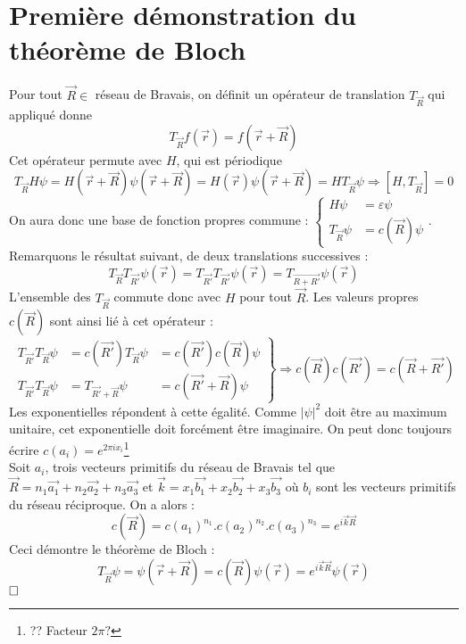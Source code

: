 	\section{Première démonstration du théorème de Bloch}
	Pour tout $\vec{R}\in$ réseau de Bravais, on définit un opérateur 
	de translation $T_{\vec{R}}$ qui appliqué donne
	\begin{equation}
	T_{\vec{R}}f(\vec{r}) = f(\vec{r}+\vec{R})
	\end{equation}
	Cet opérateur permute avec $H$, qui est périodique 
	\begin{equation}
	T_{\vec{R}}H\psi = H(\vec{r}+\vec {R})\psi(\vec r+\vec R) = H(\vec{r})
	\psi(\vec r+\vec R) = HT_{\vec{R}}\psi \Longrightarrow[H,T_{\vec{R}}]=0
	\end{equation}
	On aura donc une base de fonction propres commune : 
	$\left\{\begin{array}{ll}
	H\psi &= \varepsilon\psi\\
	T_{\vec{R}}\psi &= c(\vec{R})\psi
	\end{array}\right.$. Remarquons le résultat suivant, de deux 
	translations successives :
	\begin{equation}
	T_{\vec{R}}T_{\vec{R'}}\psi(\vec{r})=T_{\vec{R'}}T_{\vec{R'}}\psi(\vec{r})
	=T_{\vec{R+R'}}\psi(\vec{r})
	\end{equation}
	L'ensemble des $T_{\vec{R}}$ commute donc avec $H$ pour tout $\vec{R}$.
	Les valeurs propres $c(\vec{R})$ sont ainsi lié à cet opérateur : 
	\begin{equation}
	\left.\begin{array}{lll}
	T_{\vec{R'}}T_{\vec{R}}\psi &= c(\vec{R'})T_{\vec{R}}\psi &= c(\vec{R'})
	c(\vec{R})\psi\\
	T_{\vec{R'}}T_{\vec{R}}\psi &=T_{\vec{R'}+\vec{R}}\psi &=c(\vec{R'}+
	\vec{R})\psi
	\end{array}\right\}\Rightarrow c(\vec{R})c(\vec{R'}) = c(\vec{R}+\vec{R'})
	\end{equation}
	Les exponentielles répondent à cette égalité. Comme $|\psi|^2$ doit être 
	au maximum unitaire, cet exponentielle doit forcément être imaginaire. On 
	peut donc toujours écrire $c(a_i) = e^{2\pi i x_i}$\footnote{?? Facteur $2\pi?$} \\
	Soit $a_i$, trois vecteurs primitifs du réseau de Bravais tel que 
	$\vec{R} = n_1\vec{a_1}+n_2\vec{a_2}+n_3\vec{a_3}$ et $\vec{k} = x_1\vec{b_1}
	+x_2\vec{b_2}+x_3\vec{b_3}$ où $b_i$ sont les vecteurs primitifs du réseau 
	réciproque. On a alors :
	\begin{equation}
	c(\vec{R}) = c(a_1)^{n_1}.c(a_2)^{n_2}.c(a_3)^{n_3} = e^{i\vec{k}\vec{R}}
	\end{equation}
	Ceci démontre le théorème de Bloch :
	\begin{equation}
	\displaystyle
	T_{\vec{R}}\psi = \psi(\vec{r}+\vec{R}) = c(\vec{R})\psi(\vec{r}) = 
	e^{i\vec{k}\vec{R}}\psi(\vec{r})
	\end{equation}
	$\hfill\square$
	
